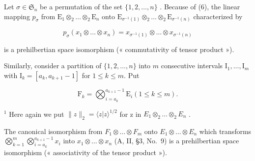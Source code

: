 Let \(\sigma \in \mathfrak{S}_n\) be a permutation of the set \(\{1, 2, \dots, n\}\) . Because of (6), the linear mapping \(p_{\sigma}\) from \(\mathrm{E}_1 \otimes_2 \dots \otimes_2 \mathrm{E}_n\) onto \(\mathrm{E}_{\sigma^{-1}(1)} \otimes_2 \dots \otimes_2 \mathrm{E}_{\sigma^{-1}(n)}\) characterized by

\[
p _ {\sigma} \left(x _ {1} \otimes \dots \otimes x _ {n}\right) = x _ {\sigma^ {- 1} (1)} \otimes \dots \otimes x _ {\sigma^ {- 1} (n)}\tag{9}
\]

is a prehilbertian space isomorphism (« commutativity of tensor product »).

Similarly, consider a partition of \(\{1, 2, \dots , n\}\) into \(m\) consecutive intervals \(\mathrm{I}_{1}, \dots , \mathrm{I}_{m}\) with \(\mathrm{I}_{k} = [a_{k}, a_{k + 1} - 1]\) for \(1 \leqslant k \leqslant m\). Put

\[
\mathrm{F} _ {k} = \bigotimes_ {i = a _ {k}} ^ {a _ {k + 1} - 1} \mathrm{E} _ {i} (1 \leqslant k \leqslant m).
\]

\(^{1}\) Here again we put \(\|z\|_{2} = \langle z|z\rangle^{1/2}\) for z in \(E_{1} \otimes_{2} \ldots \otimes_{2} E_{n}\) .

The canonical isomorphism from \(F_{1} \otimes \ldots \otimes F_{m}\) onto \(E_{1} \otimes \ldots \otimes E_{n}\) which transforms \(\bigotimes_{k=1}^{m} \bigotimes_{i=a_{k}}^{a_{k+1}-1} x_{i}\) into \(x_{1} \otimes \ldots \otimes x_{n}\) (A, II, §3, No.~9) is a prehilbertian space isomorphism (« associativity of the tensor product »).

